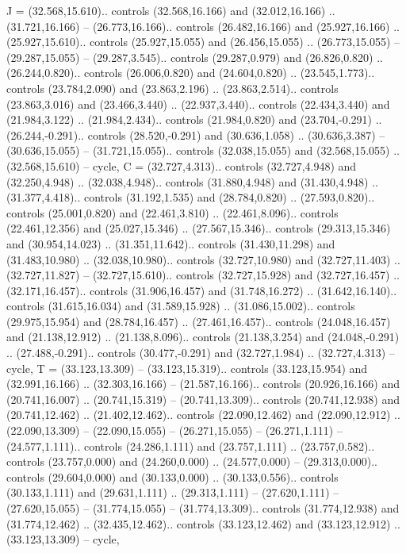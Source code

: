 {J} = {(32.568,15.610).. controls (32.568,16.166) and (32.012,16.166) .. (31.721,16.166) -- (26.773,16.166).. controls (26.482,16.166) and (25.927,16.166) .. (25.927,15.610).. controls (25.927,15.055) and (26.456,15.055) .. (26.773,15.055) -- (29.287,15.055) -- (29.287,3.545).. controls (29.287,0.979) and (26.826,0.820) .. (26.244,0.820).. controls (26.006,0.820) and (24.604,0.820) .. (23.545,1.773).. controls (23.784,2.090) and (23.863,2.196) .. (23.863,2.514).. controls (23.863,3.016) and (23.466,3.440) .. (22.937,3.440).. controls (22.434,3.440) and (21.984,3.122) .. (21.984,2.434).. controls (21.984,0.820) and (23.704,-0.291) .. (26.244,-0.291).. controls (28.520,-0.291) and (30.636,1.058) .. (30.636,3.387) -- (30.636,15.055) -- (31.721,15.055).. controls (32.038,15.055) and (32.568,15.055) .. (32.568,15.610) -- cycle},
{C} = {(32.727,4.313).. controls (32.727,4.948) and (32.250,4.948) .. (32.038,4.948).. controls (31.880,4.948) and (31.430,4.948) .. (31.377,4.418).. controls (31.192,1.535) and (28.784,0.820) .. (27.593,0.820).. controls (25.001,0.820) and (22.461,3.810) .. (22.461,8.096).. controls (22.461,12.356) and (25.027,15.346) .. (27.567,15.346).. controls (29.313,15.346) and (30.954,14.023) .. (31.351,11.642).. controls (31.430,11.298) and (31.483,10.980) .. (32.038,10.980).. controls (32.727,10.980) and (32.727,11.403) .. (32.727,11.827) -- (32.727,15.610).. controls (32.727,15.928) and (32.727,16.457) .. (32.171,16.457).. controls (31.906,16.457) and (31.748,16.272) .. (31.642,16.140).. controls (31.615,16.034) and (31.589,15.928) .. (31.086,15.002).. controls (29.975,15.954) and (28.784,16.457) .. (27.461,16.457).. controls (24.048,16.457) and (21.138,12.912) .. (21.138,8.096).. controls (21.138,3.254) and (24.048,-0.291) .. (27.488,-0.291).. controls (30.477,-0.291) and (32.727,1.984) .. (32.727,4.313) -- cycle},
{T} = {(33.123,13.309) -- (33.123,15.319).. controls (33.123,15.954) and (32.991,16.166) .. (32.303,16.166) -- (21.587,16.166).. controls (20.926,16.166) and (20.741,16.007) .. (20.741,15.319) -- (20.741,13.309).. controls (20.741,12.938) and (20.741,12.462) .. (21.402,12.462).. controls (22.090,12.462) and (22.090,12.912) .. (22.090,13.309) -- (22.090,15.055) -- (26.271,15.055) -- (26.271,1.111) -- (24.577,1.111).. controls (24.286,1.111) and (23.757,1.111) .. (23.757,0.582).. controls (23.757,0.000) and (24.260,0.000) .. (24.577,0.000) -- (29.313,0.000).. controls (29.604,0.000) and (30.133,0.000) .. (30.133,0.556).. controls (30.133,1.111) and (29.631,1.111) .. (29.313,1.111) -- (27.620,1.111) -- (27.620,15.055) -- (31.774,15.055) -- (31.774,13.309).. controls (31.774,12.938) and (31.774,12.462) .. (32.435,12.462).. controls (33.123,12.462) and (33.123,12.912) .. (33.123,13.309) -- cycle},
